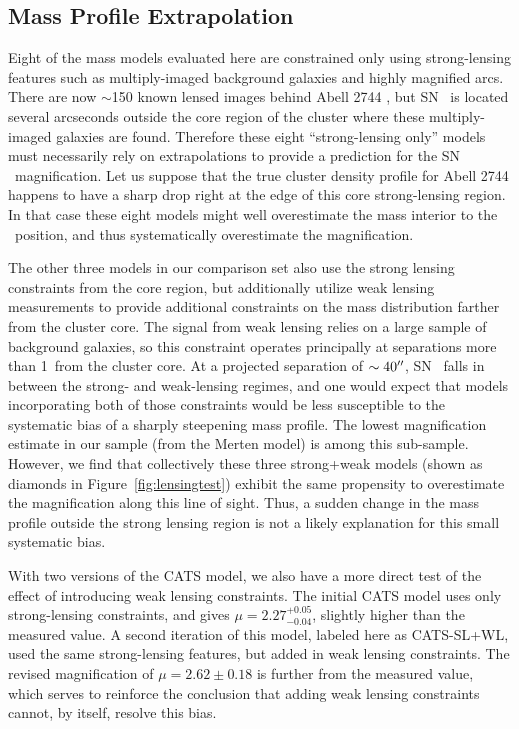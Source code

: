 \subsection{Mass Profile Extrapolation}
\label{sec:MassProfileExtrapolation}

Eight of the mass models evaluated here are constrained only using
strong-lensing features such as multiply-imaged background galaxies
and highly magnified arcs.  There are now $\sim$150 known lensed
images behind Abell 2744 \citep{Jauzac:2014c}, but SN \tomas\ is
located several arcseconds outside the core region of the cluster
where these multiply-imaged galaxies are found.  Therefore these eight
``strong-lensing only'' models must necessarily rely on extrapolations
to provide a prediction for the SN \tomas\ magnification.  Let us
suppose that the true cluster density profile for Abell 2744 happens
to have a sharp drop right at the edge of this core strong-lensing
region. In that case these eight models might well overestimate the
mass interior to the \tomas\ position, and thus systematically
overestimate the magnification.

The other three models in our comparison set also use the strong
lensing constraints from the core region, but additionally utilize
weak lensing measurements to provide additional constraints on the
mass distribution farther from the cluster core.  The signal from weak
lensing relies on a large sample of background galaxies, so this
constraint operates principally at separations more than 1\arcmin\
from the cluster core.  At a projected separation of $\sim40^{\prime\prime}$,
SN \tomas\ falls in between the strong- and weak-lensing regimes, and
one would expect that models incorporating both of those constraints
would be less susceptible to the \changeR{possible} systematic bias of
a sharply steepening mass profile.  The lowest magnification estimate
in our sample (from the Merten model) is among this sub-sample.
However, we find that collectively these three strong+weak models
(shown as diamonds in Figure~\ref{fig:lensingtest}) exhibit the same
propensity to overestimate the magnification along this line of sight.
Thus, a sudden change in the mass profile outside the strong lensing
region is not a likely explanation for this small systematic bias.

With two versions of the CATS model, we also have a more direct test
of the effect of introducing weak lensing constraints.  The initial
CATS model uses only strong-lensing constraints, and gives
$\mu=2.27^{+0.05}_{-0.04}$, slightly higher than the measured value.
A second iteration of this model, labeled here as CATS-SL+WL, used the
same strong-lensing features, but added in weak lensing constraints.
The revised magnification of $\mu=2.62\pm0.18$ is further from the
measured value, which serves to reinforce the conclusion that adding
weak lensing constraints cannot, by itself, resolve this bias.


